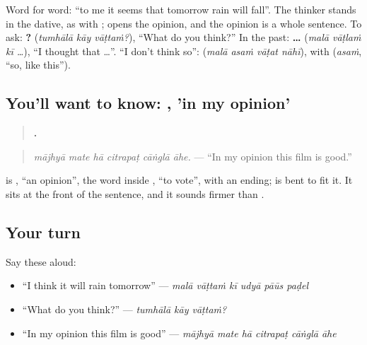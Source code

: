 Word for word: \textquotedblleft{}to me it seems that tomorrow rain will fall\textquotedblright{}. The thinker stands in the dative, as with \textbf{}; \textbf{} opens the opinion, and the opinion is a whole sentence. To ask: \textbf{  ?} (\emph{tumhālā kāy vāṭtaṁ?}), \textquotedblleft{}What do you think?\textquotedblright{} In the past: \textbf{   …} (\emph{malā vāṭlaṁ kī …}), \textquotedblleft{}I thought that …\textquotedblright{}. \textquotedblleft{}I don't think so\textquotedblright{}: \textbf{   } (\emph{malā asaṁ vāṭat nāhī}), with \textbf{} (\emph{asaṁ}, \textquotedblleft{}so, like this\textquotedblright{}).

\subsection*{You'll want to know:  , 'in my opinion'}
\begin{quote}
\textbf{     .}
\end{quote}

\begin{quote}
\emph{mājhyā mate hā citrapaṭ cāṅglā āhe.} — \textquotedblleft{}In my opinion this film is good.\textquotedblright{}
\end{quote}

\textbf{} is \textbf{}, \textquotedblleft{}an opinion\textquotedblright{}, the word inside \textbf{ }, \textquotedblleft{}to vote\textquotedblright{}, with an ending; \textbf{} is \textbf{} bent to fit it. It sits at the front of the sentence, and it sounds firmer than \textbf{ }.

\subsection*{Your turn}
Say these aloud:

\begin{itemize}
\raggedright
  \item \textquotedblleft{}I think it will rain tomorrow\textquotedblright{} — \emph{malā vāṭtaṁ kī udyā pāūs paḍel}
  \item \textquotedblleft{}What do you think?\textquotedblright{} — \emph{tumhālā kāy vāṭtaṁ?}
  \item \textquotedblleft{}In my opinion this film is good\textquotedblright{} — \emph{mājhyā mate hā citrapaṭ cāṅglā āhe}
\end{itemize}

